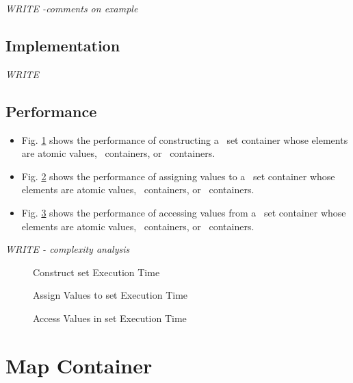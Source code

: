 \vspace{0.4cm} \textit{WRITE -comments on example}

\subsection{Implementation} \label{sec-set-cont-impl}

\textit{WRITE}

\subsection{Performance} \label{sec-set-cont-perf}

\begin{itemize}
\item
Fig. \ref{fig:set-cont-constr-exper}
shows the performance of constructing a \stapl\ set container
whose elements are atomic values, \stl\ containers, or \stapl\ containers.
\item
Fig. \ref{fig:set-cont-assign-exper}
shows the performance of assigning values to a \stapl\ set container
whose elements are atomic values, \stl\ containers, or \stapl\ containers.
\item
Fig. \ref{fig:set-cont-access-exper}
shows the performance of accessing values from a \stapl\ set container
whose elements are atomic values, \stl\ containers, or \stapl\ containers.
\end{itemize}

\textit{WRITE - complexity analysis}

\begin{figure}[p]
\caption{Construct set Execution Time}
\label{fig:set-cont-constr-exper}
\end{figure}

\begin{figure}[p]
\caption{Assign Values to set Execution Time}
\label{fig:set-cont-assign-exper}
\end{figure}

\begin{figure}[p]
\caption{Access Values in set Execution Time}
\label{fig:set-cont-access-exper}
\end{figure}



\section{ Map Container} \label{sec-map-cont}

